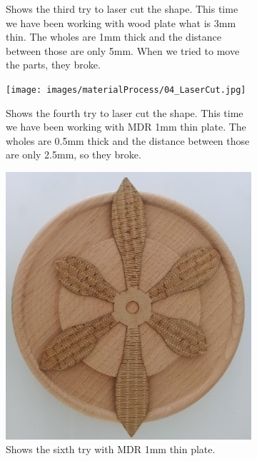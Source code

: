 \documentclass[04.3_buildingProcess.tex]{subfiles}
\begin{document}
\begin{flushleft}
\begin{figure}[H]
\begin{subfigure}{.45\textwidth}
                \caption{Shows the third try to laser cut the shape. This time we have been
                        working with wood plate what is 3mm thin. The wholes are 1mm thick 
                        and the distance between those are only 5mm. When we tried to move
                        the parts, they broke.}
                \label{fig:03_LaserCut}
                \vspace{6mm}
            \end{subfigure}
            \hspace{1mm}
            \begin{subfigure}{.45\textwidth}
                \centering
                \texttt{[image: images/materialProcess/04\_LaserCut.jpg]}
                \caption{Shows the fourth try to laser cut the shape. This time we have been
                        working with MDR 1mm thin plate. The wholes are 0.5mm thick and the 
                        distance between those are only 2.5mm, so they broke.}
                \label{fig:04_LaserCut}
                \vspace{6mm}
            \end{subfigure}
            \hspace{1mm}
            \begin{subfigure}{.45\textwidth}
                \centering
                \includegraphics[width=0.6\linewidth]{images/materialProcess/06_LaserCut.jpg}
                \caption{Shows the sixth try with MDR 1mm thin plate.}
                \label{fig:04_LaserCut}
                \vspace{6mm}
            \end{subfigure}
            \begin{subfigure}{.45\textwidth}

\end{subfigure}
\end{figure}
\end{flushleft}
\end{document}
